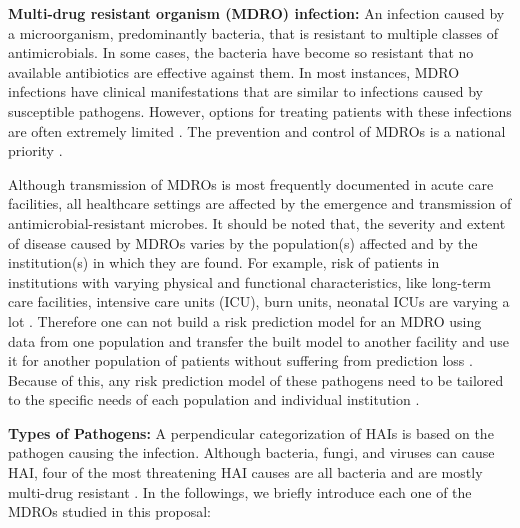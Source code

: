 {\bf Multi-drug resistant organism (MDRO) infection:} An infection caused by a microorganism, predominantly bacteria, that is resistant to multiple classes of antimicrobials. In some cases, the bacteria have become so resistant that no available antibiotics are effective against them. In most instances, MDRO infections have clinical manifestations that are similar to infections caused by susceptible pathogens. However, options for treating patients with these infections are often extremely limited \cite{siegel2007management}. The prevention and control of MDROs is a national priority \cite{lederberg1998antimicrobial, shlaes1997society}.

Although transmission of MDROs is most frequently documented in acute care facilities, all healthcare settings are affected by the emergence and transmission of antimicrobial-resistant microbes. It should be noted that, the severity and extent of disease caused by MDROs varies by the population(s) affected and by the institution(s) in which they are found. For example, risk of patients in institutions with varying physical and functional characteristics, like long-term care facilities, intensive care units (ICU), burn units, neonatal ICUs are varying a lot \cite{siegel2007management}. Therefore one can not build a risk prediction model for an MDRO using data from one population and transfer the built model to another facility and use it for another population of patients without suffering from prediction loss \cite{wiens2014study}. Because of this, any risk prediction model of these pathogens need to be tailored to the specific needs of each population and individual institution \cite{siegel2007management, wiens2014study}. 


{\bf Types of Pathogens:}
A perpendicular categorization of HAIs is based on the pathogen causing the infection. Although bacteria, fungi, and viruses can cause HAI, four of the most threatening HAI causes are all bacteria and are mostly multi-drug resistant  \cite{resistance, siegel2007management}. In the followings, we briefly introduce each one of the MDROs studied in this proposal:

